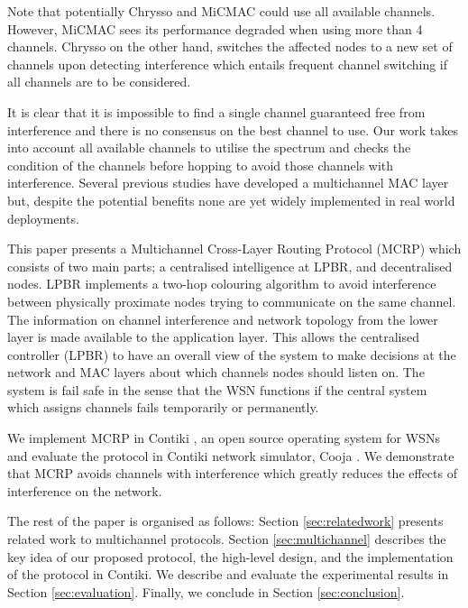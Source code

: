 Note that potentially Chrysso and MiCMAC could use all available channels.
However, MiCMAC sees its performance degraded when using more than 4 channels.
Chrysso on the other hand, switches the affected nodes to a new set of channels upon detecting interference which entails frequent channel switching if all channels are to be considered. 


It is clear that it is impossible to find a single channel guaranteed free from interference and there is no consensus on the best channel to use. Our work takes into account all available channels to utilise the spectrum and checks the condition of the channels before hopping to avoid those channels with interference. Several previous studies have developed a multichannel MAC layer but, despite the potential benefits none are yet widely implemented in real world deployments.

This paper presents a Multichannel Cross-Layer Routing Protocol (MCRP) which consists of two main parts; a centralised intelligence at LPBR, and decentralised nodes. LPBR implements a two-hop colouring algorithm to avoid interference between physically proximate nodes trying to communicate on the same channel. The information on channel interference and network topology from the lower layer is made available to the application layer. This allows the centralised controller (LPBR) to have an overall view of the system to make decisions at the network and MAC layers about which channels nodes should listen on. The system is fail safe in the sense that the WSN functions if the central system which assigns channels fails temporarily or permanently.

We implement MCRP in Contiki \cite{contiki}, an open source operating system for WSNs and evaluate the protocol in Contiki network simulator, Cooja \cite{cooja}. 
We demonstrate that MCRP avoids channels with interference which greatly reduces the effects of interference on the network.

The rest of the paper is organised as follows: Section \ref{sec:relatedwork} presents related work to multichannel protocols. Section \ref{sec:multichannel} describes the key idea of our proposed protocol, the high-level design, and the implementation of the protocol in Contiki. We describe and evaluate the experimental results in Section \ref{sec:evaluation}. Finally, we conclude in Section \ref{sec:conclusion}.
